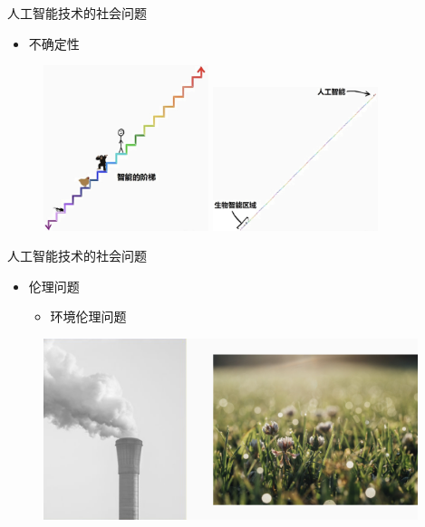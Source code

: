 \documentclass{beamer}
\begin{document}
\begin{frame}{人工智能技术的社会问题}
  \begin{itemize}
   \item 不确定性
  \end{itemize}

  \begin{figure}[H]
   \centering
   \includegraphics[width=1.9in]{zsjPic2.jpg}
   \hspace*{0.3in}
   \includegraphics[width=1.9in]{zsjPic3.jpg}
   \end{figure}

\end{frame} 

\begin{frame}{人工智能技术的社会问题}
  \begin{itemize}
    \item 伦理问题 
      \begin{itemize}
       \item  环境伦理问题 
      \end{itemize}
  \end{itemize}

  \begin{figure}[H]
   \centering
   \includegraphics[width=4.3in]{zsjPic4.jpg}
   \end{figure}
  \end{frame}
\end{document}
